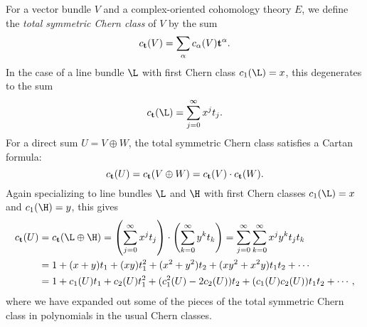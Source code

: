 \begin{remark}
For a vector bundle $V$ and a complex-oriented cohomology theory $E$, we define the \textit{total symmetric Chern class} of $V$ by the sum \[c_{\mathbf t}(V) = \sum_\alpha c_\alpha(V) \mathbf t^{\alpha}.\]  In the case of a line bundle $\L$ with first Chern class $c_1(\L) = x$, this degenerates to the sum \[c_{\t}(\L) = \sum_{j=0}^\infty x^j t_j.\]  For a direct sum $U = V \oplus W$, the total symmetric Chern class satisfies a Cartan formula: \[c_{\mathbf t}(U) = c_{\mathbf t}(V \oplus W) = c_{\mathbf t}(V) \cdot c_{\mathbf t}(W).\]  Again specializing to line bundles $\L$ and $\H$ with first Chern classes $c_1(\L) = x$ and $c_1(\H) = y$, this gives
\begin{align*}
c_{\t}(U) & = c_{\t}(\L \oplus \H) = \left( \sum_{j=0}^\infty x^j t_j \right) \cdot \left( \sum_{k=0}^\infty y^k t_k \right) = \sum_{j = 0}^{\infty} \sum_{k=0}^\infty x^j y^k t_j t_k \\
& = 1 + (x + y)t_1 + (xy)t_1^2 + (x^2 + y^2)t_2 + (xy^2 + x^2y)t_1 t_2 + \cdots \\
& = 1 + c_1(U)t_1 + c_2(U)t_1^2 + (c_1^2(U) - 2c_2(U))t_2 + (c_1(U) c_2(U))t_1t_2 + \cdots,
\end{align*}
where we have expanded out some of the pieces of the total symmetric Chern class in polynomials in the usual Chern classes.
\end{remark}

